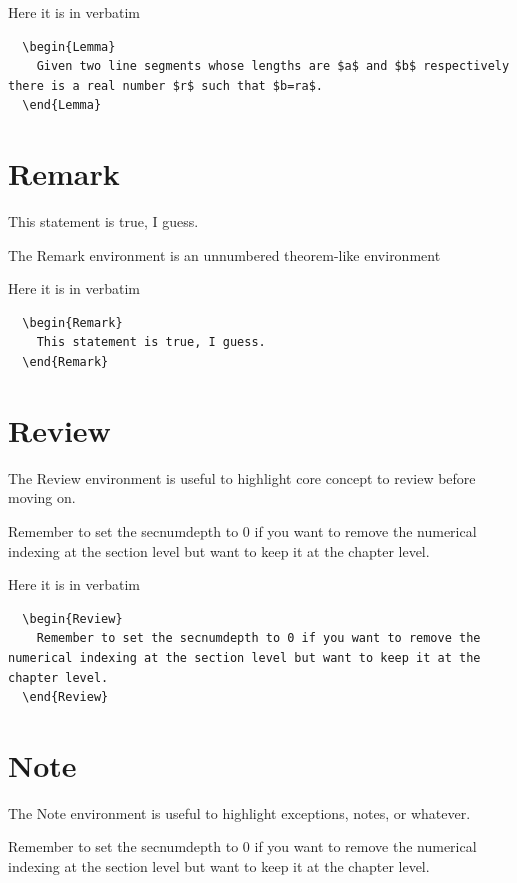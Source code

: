 \documentclass[letterpaper,10pt,twoside,twocolumn,openany]{book}
\begin{document}
Here it is in verbatim
\begin{verbatim}
  \begin{Lemma}
    Given two line segments whose lengths are $a$ and $b$ respectively there is a real number $r$ such that $b=ra$.
  \end{Lemma}
\end{verbatim}


\section{Remark}
\begin{Remark}
  This statement is true, I guess.
\end{Remark}
The Remark environment is an unnumbered theorem-like environment

Here it is in verbatim
\begin{verbatim}
  \begin{Remark}
    This statement is true, I guess.
  \end{Remark} 
\end{verbatim}

\section{Review}
The Review environment is useful to highlight core concept to review before moving on.
\begin{Review}
  Remember to set the secnumdepth to 0 if you want to remove the numerical indexing at the section level but want to keep it at the chapter level.
\end{Review}

Here it is in verbatim
\begin{verbatim}
  \begin{Review}
    Remember to set the secnumdepth to 0 if you want to remove the numerical indexing at the section level but want to keep it at the chapter level.
  \end{Review} 
\end{verbatim}

\section{Note}
The Note environment is useful to highlight exceptions, notes, or whatever.
\begin{Note}
  Remember to set the secnumdepth to 0 if you want to remove the numerical indexing at the section level but want to keep it at the chapter level.
\end{Note}
\end{document}
